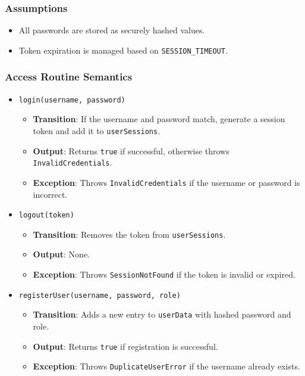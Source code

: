 \documentclass[12pt, titlepage]{article}
\begin{document}
\subsubsection{Assumptions}

\begin{itemize}
  \item All passwords are stored as securely hashed values.
  \item Token expiration is managed based on \texttt{SESSION\_TIMEOUT}.
\end{itemize}

\subsubsection{Access Routine Semantics}

\begin{itemize}
  \item \texttt{login(username, password)}
        \begin{itemize}
          \item \textbf{Transition}: If the username and password match, generate a session token and add it to \texttt{userSessions}.
          \item \textbf{Output}: Returns \texttt{true} if successful, otherwise throws \texttt{InvalidCredentials}.
          \item \textbf{Exception}: Throws \texttt{InvalidCredentials} if the username or password is incorrect.
        \end{itemize}

  \item \texttt{logout(token)}
        \begin{itemize}
          \item \textbf{Transition}: Removes the token from \texttt{userSessions}.
          \item \textbf{Output}: None.
          \item \textbf{Exception}: Throws \texttt{SessionNotFound} if the token is invalid or expired.
        \end{itemize}

  \item \texttt{registerUser(username, password, role)}
        \begin{itemize}
          \item \textbf{Transition}: Adds a new entry to \texttt{userData} with hashed password and role.
          \item \textbf{Output}: Returns \texttt{true} if registration is successful.
          \item \textbf{Exception}: Throws \texttt{DuplicateUserError} if the username already exists.
        \end{itemize}


\end{itemize}
\end{document}
